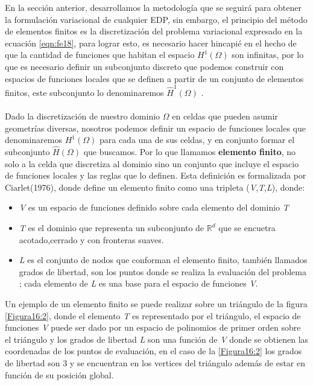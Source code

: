 En la sección anterior, desarrollamos la metodología que se seguirá para obtener la formulación variacional de cualquier EDP, sin embargo, el principio del método de elementos finitos es la discretización del problema variacional expresado en la ecuación \ref{eqn:fe18}, para lograr esto, es necesario hacer hincapié en el hecho de que la cantidad de funciones que habitan el espacio $H^{1}(\Omega)$ son infinitas, por lo que es necesario definir un subconjunto discreto que podemos construir con espacios de funciones locales que se definen a partir de un conjunto de elementos finitos, este subconjunto lo denominaremos $\hat{H}^{1}(\Omega)$ \cite{Logg2012}   \cite{Whiteley2017}. 
\\
\\
Dado la discretización de nuestro dominio $\Omega$ en celdas que pueden asumir geometrías diversas, nosotros podemos definir un espacio de funciones locales que denominaremos $\textit{H}^{1}(\Omega)$  para cada una de sus celdas, y en conjunto formar el subconjunto $\hat{H}(\Omega)$ que buscamos. Por lo que llamamos \textbf{elemento finito}, no solo a la celda que discretiza al dominio sino un conjunto que incluye el espacio de funciones locales y las reglas que lo definen. Esta definición es formalizada por Ciarlet(1976), donde define un elemento finito como una tripleta (\textit{V},\textit{T},\textit{L}), donde:

\begin{itemize}
\item \textit{V} es un espacio de funciones definido sobre cada elemento del dominio \textit{T}
\item \textit{T} es el dominio que representa un subconjunto de $\mathbb{R}^{d}$ que se encuetra acotado,cerrado y con fronteras suaves. 
\item \textit{L} es el conjunto de  nodos que conforman el elemento finito, también llamados grados de libertad, son los puntos donde se realiza la evaluación del problema
; cada elemento de \textit{L} es una base para el espacio de funciones \textit{V}.
\end{itemize}


Un ejemplo de un elemento finito se puede realizar sobre un triángulo de la figura \ref{Figura16:2}, donde el elemento \textit{T} es representado por el triángulo, el espacio de funciones \textit{V} puede ser dado por un espacio de polinomios de primer orden sobre el triángulo y los grados de libertad \textit{L} son una función de \textit{V} donde se obtienen las coordenadas de los puntos de evaluación, en el caso de la \ref{Figura16:2} los grados de libertad son 3 y se encuentran en los vertices del triángulo además de estar en función de su posición global.
\\

